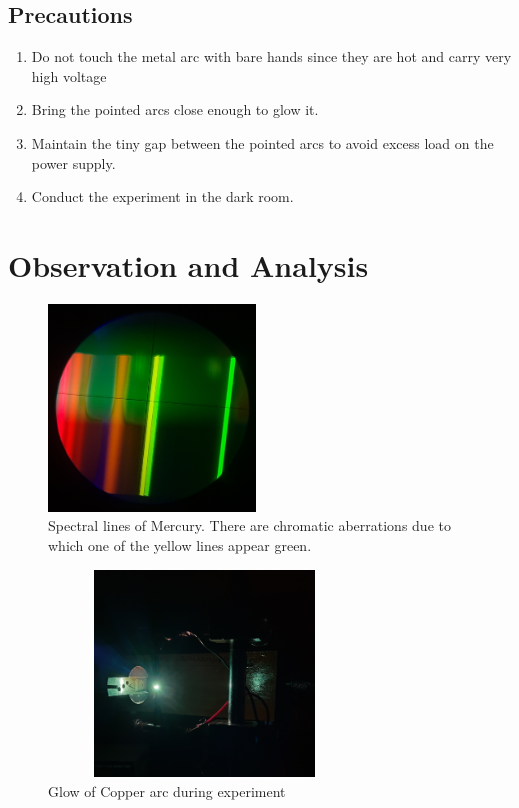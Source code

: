 \documentclass[a4paper, amsfonts, amssymb, amsmath, reprint, showkeys, nofootinbib, twoside]{revtex4-1}
\begin{document}
\subsection{Precautions}
\begin{enumerate}
	\item {Do not touch the metal arc with bare hands since they are hot and carry very high voltage}
	\item {Bring the pointed arcs close enough to glow it.}
	\item {Maintain the tiny gap between the pointed arcs to avoid excess load on the power supply.}
	\item{Conduct the experiment in the dark room.}
\end{enumerate}


\section{Observation and Analysis}

\begin{figure}[H] %
	\centering
	\includegraphics[width=5.5cm,height=5.5cm]{7} 
	\caption{Spectral lines of Mercury. There are chromatic aberrations due to which one of the yellow lines appear green.}
	\label{7}
\end{figure}

\begin{figure}[H] %
	\centering
	\includegraphics[width=8.3cm,height=5.5cm]{3} 
	\caption{Glow of Copper arc during experiment}
	\label{3}
\end{figure}
\end{document}
